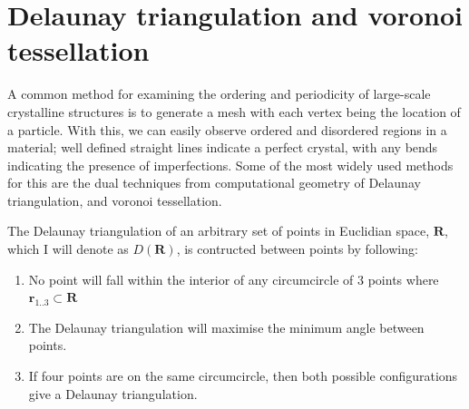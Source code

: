\section{Delaunay triangulation and voronoi tessellation}
A common method for examining the ordering and periodicity of large-scale crystalline structures is to generate a mesh with each vertex being the location of a particle. With this, we can easily observe ordered and disordered regions in a material; well defined straight lines indicate a perfect crystal, with any bends indicating the presence of imperfections. Some of the most widely used methods for this are the dual techniques from computational geometry of Delaunay triangulation, and voronoi tessellation.

The Delaunay triangulation of an arbitrary set of points in Euclidian space, $\mathbf{R}$, which I will denote as $D(\mathbf{R})$, is contructed between points by following:
\begin{enumerate}
    \item No point will fall within the interior of any circumcircle of 3 points where $\mathbf{r}_{1..3} \subset \mathbf{R}$
    \item The Delaunay triangulation will maximise the minimum angle between points.
    \item If four points are on the same circumcircle, then both possible configurations give a Delaunay triangulation.
\end{enumerate}

